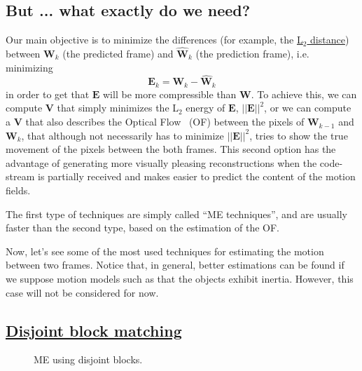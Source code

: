 \subsection{But ... what exactly do we need?}
Our main objective is to minimize the differences (for example, the
\href{https://en.wikipedia.org/wiki/Euclidean_distance}{L$_2$
  distance}) between ${\mathbf W}_k$ (the predicted frame) and $\hat{\mathbf W}_k$ (the
prediction frame), i.e. minimizing
\begin{equation}
  {\mathbf E}_k = {\mathbf W}_k - \hat{\mathbf W}_k
\end{equation}
in order to get that ${\mathbf E}$ will be more compressible than
${\mathbf W}$. To achieve this, we can compute ${\mathbf V}$ that
simply minimizes the L$_2$ energy of ${\mathbf E}$, $||{\mathbf
  E}||^2$, or we can compute a ${\mathbf V}$ that also describes the
Optical Flow~\cite{horn1981determining} (OF) between the pixels of
${\mathbf W}_{k-1}$ and ${\mathbf W}_k$, that although not necessarily
has to minimize $||{\mathbf E}||^2$, tries to show the true movement
of the pixels between the both frames. This second option has the
advantage of generating more visually pleasing reconstructions when
the code-stream is partially received and makes easier to predict the
content of the motion fields.

The first type of techniques are simply called ``ME techniques'', and
are usually faster than the second type, based on the estimation of
the OF.


Now, let's see some of the most used techniques for estimating the
motion between two frames. Notice that, in general, better estimations
can be found if we suppose motion models such as that the objects
exhibit inertia. However, this case will not be considered for now.

\subsection{\href{https://vicente-gonzalez-ruiz.github.io/video_compression/\#x1-40003}{Disjoint block matching}}

\begin{figure}
  \centering
  \caption{ME using disjoint blocks.}
  \label{fig:simple}
\end{figure}

